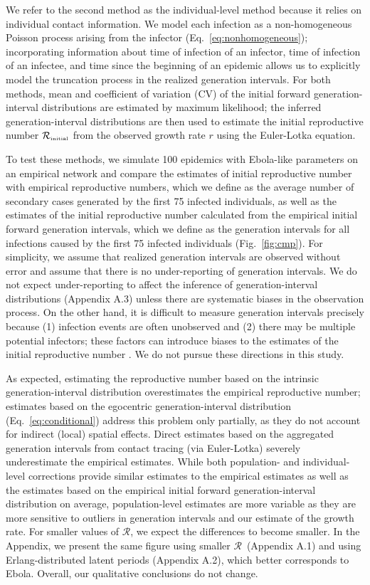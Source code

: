 \documentclass[12pt]{article}
\newcommand{\eref}[1]{Eq.~\ref{eq:#1}}
\newcommand{\fref}[1]{Fig.~\ref{fig:#1}}
\newcommand{\Rx}[1]{\ensuremath{{\mathcal R}_{#1}}\xspace}
\newcommand{\RR}{\ensuremath{{\mathcal R}}}
\newcommand{\Rini}{\Rx{\textrm{\tiny initial}}}
\begin{document}
We refer to the second method as the individual-level method because it relies on individual contact information.
We model each infection as a non-homogeneous Poisson process arising from the infector (\eref{nonhomogeneous}); 
incorporating information about time of infection of an infector, time of infection of an infectee, and time since the beginning of an epidemic allows us to explicitly model the truncation process in the realized generation intervals.
For both methods, mean and coefficient of variation (CV) of the initial forward generation-interval distributions are estimated by maximum likelihood; the inferred generation-interval distributions are then used to estimate the initial reproductive number $\Rini$ from the observed growth rate $r$ using the Euler-Lotka equation.

To test these methods, we simulate 100 epidemics with Ebola-like parameters on an empirical network \citep{leskovec2016snap}
and compare the estimates of initial reproductive number with empirical reproductive numbers, which we define as the average number of secondary cases generated by the first 75 infected individuals,
as well as the estimates of the initial reproductive number calculated from the empirical initial forward generation intervals, which we define as the generation intervals for all infections caused by the first 75 infected individuals (\fref{cmp}).
For simplicity, we assume that realized generation intervals are observed without error and assume that there is no under-reporting of generation intervals.
We do not expect under-reporting to affect the inference of generation-interval distributions (Appendix A.3) unless there are systematic biases in the observation process.
On the other hand, it is difficult to measure generation intervals precisely because (1) infection events are often unobserved and (2) there may be multiple potential infectors; these factors can introduce biases to the estimates of the initial reproductive number \cite{britton2019estimation}.
We do not pursue these directions in this study.

As expected, estimating the reproductive number based on the intrinsic generation-interval distribution overestimates the empirical reproductive number;
estimates based on the egocentric generation-interval distribution (\eref{conditional}) address this problem only partially, as they do not account for indirect (local) spatial effects. 
Direct estimates based on the aggregated generation intervals from contact tracing (via Euler-Lotka) severely underestimate the empirical estimates.
While both population- and individual-level corrections provide similar estimates to the empirical estimates as well as the estimates based on the empirical initial forward generation-interval distribution on average,
population-level estimates are more variable as they are more sensitive to outliers in generation intervals and our estimate of the growth rate.
For smaller values of \RR, we expect the differences to become smaller.
In the Appendix, we present the same figure using smaller \RR\ (Appendix A.1) and using Erlang-distributed latent periods (Appendix A.2), which better corresponds to Ebola.
Overall, our qualitative conclusions do not change.
\end{document}

